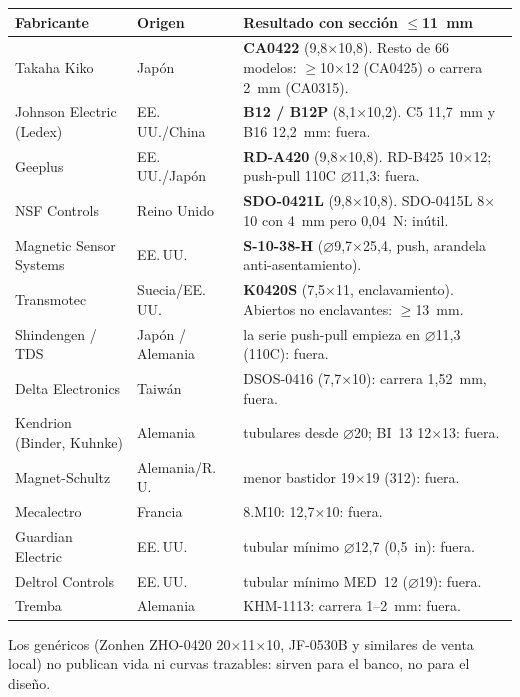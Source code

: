 \documentclass[11pt,a4paper]{article}
\begin{document}
\begin{table}[H]\centering\footnotesize\setlength{\tabcolsep}{3pt}
\begin{tabular}{p{3.3cm} p{2.4cm} p{9.2cm}}
\toprule
Fabricante & Origen & Resultado con sección $\leq$11~mm\\
\midrule
Takaha Kiko & Japón & \textbf{CA0422} (9,8$\times$10,8). Resto de 66 modelos: $\geq$10$\times$12 (CA0425) o carrera 2~mm (CA0315).\\
Johnson Electric (Ledex) & EE.\,UU./China & \textbf{B12 / B12P} (8,1$\times$10,2). C5 11,7~mm y B16 12,2~mm: fuera.\\
Geeplus & EE.\,UU./Japón & \textbf{RD-A420} (9,8$\times$10,8). RD-B425 10$\times$12; push-pull 110C $\varnothing$11,3: fuera.\\
NSF Controls & Reino Unido & \textbf{SDO-0421L} (9,8$\times$10,8). SDO-0415L 8$\times$10 con 4~mm pero 0,04~N: inútil.\\
Magnetic Sensor Systems & EE.\,UU. & \textbf{S-10-38-H} ($\varnothing$9,7$\times$25,4, push, arandela anti-asentamiento).\\
Transmotec & Suecia/EE.\,UU. & \textbf{K0420S} (7,5$\times$11, enclavamiento). Abiertos no enclavantes: $\geq$13~mm.\\
Shindengen / TDS & Japón / Alemania & la serie push-pull empieza en $\varnothing$11,3 (110C): fuera.\\
Delta Electronics & Taiwán & DSOS-0416 (7,7$\times$10): carrera 1,52~mm, fuera.\\
Kendrion (Binder, Kuhnke) & Alemania & tubulares desde $\varnothing$20; BI~13 12$\times$13: fuera.\\
Magnet-Schultz & Alemania/R.\,U. & menor bastidor 19$\times$19 (312): fuera.\\
Mecalectro & Francia & 8.M10: 12,7$\times$10: fuera.\\
Guardian Electric & EE.\,UU. & tubular mínimo $\varnothing$12,7 (0,5~in): fuera.\\
Deltrol Controls & EE.\,UU. & tubular mínimo MED~12 ($\varnothing$19): fuera.\\
Tremba & Alemania & KHM-1113: carrera 1--2~mm: fuera.\\
\bottomrule
\end{tabular}
\end{table}
Los genéricos (Zonhen ZHO-0420 20$\times$11$\times$10, JF-0530B y similares de venta local) no publican vida ni
curvas trazables: sirven para el banco, no para el diseño.

\end{document}
